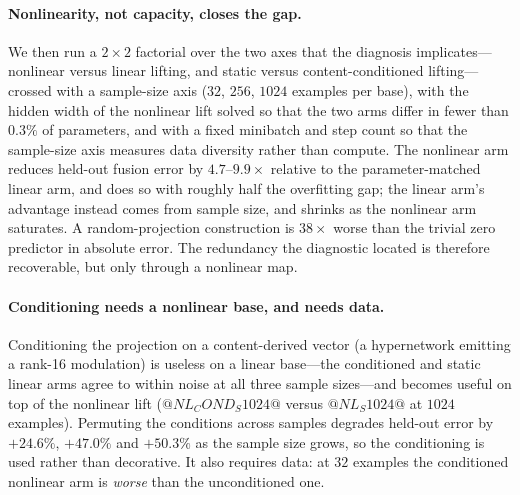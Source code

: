 \paragraph{Nonlinearity, not capacity, closes the gap.}
We then run a $2\times2$ factorial over the two axes that the diagnosis implicates---nonlinear
versus linear lifting, and static versus content-conditioned lifting---crossed with a sample-size
axis ($32$, $256$, $1024$ examples per base), with the hidden width of the nonlinear lift solved
so that the two arms differ in fewer than $0.3\%$ of parameters, and with a fixed minibatch and
step count so that the sample-size axis measures data diversity rather than compute. The
nonlinear arm reduces held-out fusion error by $4.7$--$9.9\times$ relative to the
parameter-matched linear arm, and does so with roughly half the overfitting gap; the linear arm's
advantage instead comes from sample size, and shrinks as the nonlinear arm saturates. A
random-projection construction is $38\times$ worse than the trivial zero predictor in absolute
error. The redundancy the diagnostic located is therefore recoverable, but only through a nonlinear
map.

\paragraph{Conditioning needs a nonlinear base, and needs data.}
Conditioning the projection on a content-derived vector (a hypernetwork emitting a rank-16
modulation) is useless on a linear base---the conditioned and static linear arms agree to within
noise at all three sample sizes---and becomes useful on top of the nonlinear lift
($@NL_COND_S1024@$ versus $@NL_S1024@$ at $1024$ examples). Permuting the conditions across samples
degrades held-out error by $+24.6\%$, $+47.0\%$ and $+50.3\%$ as the sample size grows, so the
conditioning is used rather than decorative. It also requires data: at $32$ examples the
conditioned nonlinear arm is \emph{worse} than the unconditioned one.

